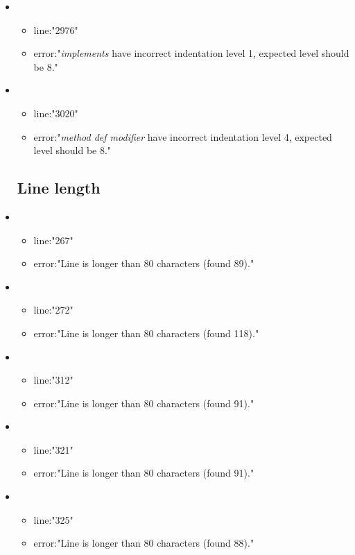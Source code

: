 \begin{itemize}
\begin{itemize}
	\end{itemize}
	\item 
	\begin{itemize} 
		\item line:"2976" 
		\item error:"\emph{implements} have incorrect indentation level 1, expected level should be 8." 
	\end{itemize}
	\item 
	\begin{itemize} 
		\item line:"3020" 
		\item error:"\emph{method def modifier} have incorrect indentation level 4, expected level should be 8." 
	\end{itemize}
\subsection{Line length} %
\label{sub:line_length}
	\item 
	\begin{itemize} 
		\item line:"267" 
		\item error:"Line is longer than 80 characters (found 89)." 
	\end{itemize}
	\item 
	\begin{itemize} 
		\item line:"272" 
		\item error:"Line is longer than 80 characters (found 118)." 
	\end{itemize}
	\item 
	\begin{itemize} 
		\item line:"312" 
		\item error:"Line is longer than 80 characters (found 91)." 
	\end{itemize}
	\item 
	\begin{itemize} 
		\item line:"321" 
		\item error:"Line is longer than 80 characters (found 91)." 
	\end{itemize}
	\item 
	\begin{itemize} 
		\item line:"325" 
		\item error:"Line is longer than 80 characters (found 88)." 
	\end{itemize}

\end{itemize}
